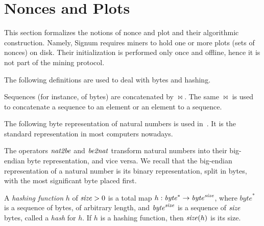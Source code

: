 \section{Nonces and Plots}\label{sec:nonces_and_plots}

This section formalizes the notions of nonce and plot and their
algorithmic construction. Namely, Signum requires miners to hold one or more plots
(sets of nonces)
on disk. Their initialization is performed only once and offline, hence it is
not part of the mining protocol.

The following definitions are used to deal with bytes and hashing.
%
\begin{definition}
  Sequences (for instance, of bytes) are concatenated by $\bowtie$. The same $\bowtie$
  is used to concatenate a sequence to an element or an element to a sequence.
\end{definition}
%
The following byte representation of natural numbers is used in~\cite{SignumPlotting}.
It is the standard representation in most computers nowadays.
%
\begin{definition}
  The operators ${\mathit{nat2be}}$ and ${\mathit{be2nat}}$ transform natural numbers
  into their big-endian byte representation, and vice versa. We recall that
  the big-endian representation of a natural number is its
  binary representation, split in bytes, with the most significant byte placed first.
\end{definition}
%
\begin{definition}
  A \emph{hashing function} $h$ of ${\mathit{size}}>0$
  is a total map $h:\mathit{byte}^*\to\mathit{byte}^{\mathit{size}}$, where
  $\mathit{byte}^*$ is a sequence of bytes, of arbitrary length,
  and $\mathit{byte}^{\mathit{size}}$ is a sequence of ${\mathit{size}}$ bytes, called a \emph{hash} for $h$.
  If $h$ is a hashing function, then ${\mathit{size}}(h)$ is its size.
\end{definition}


